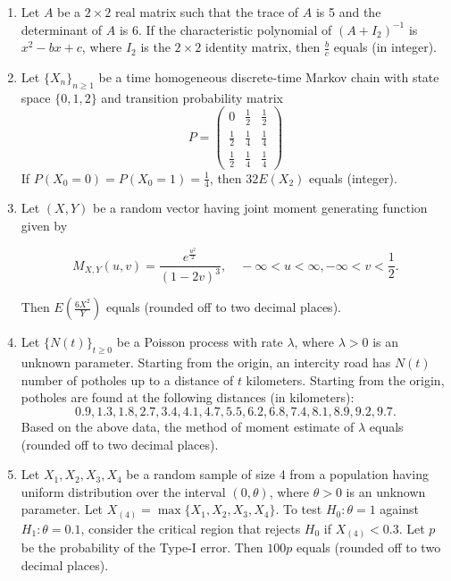 \documentclass[journal,12pt,onecolumn]{IEEEtran}
\theoremstyle{remark}
\begin{document}
\begin{enumerate}
    \item Let $A$ be a $2 \times 2$ real matrix such that the trace of $A$ is 5 and the determinant of $A$ is 6. If the characteristic polynomial of $(A + I_2)^{-1}$ is $x^2 - bx + c$, where $I_2$ is the $2 \times 2$ identity matrix, then $\frac{b}{c}$ equals {\underline{\hspace{2cm}}} (in integer).

    \item Let $\{X_n\}_{n \geq 1}$ be a time homogeneous discrete-time Markov chain with state space $\{0, 1, 2\}$ and transition probability matrix
\[
    P = \begin{pmatrix}
        0 & \frac{1}{2} & \frac{1}{2} \\
        \frac{1}{2} & \frac{1}{4} & \frac{1}{4} \\
        \frac{1}{2} & \frac{1}{4} & \frac{1}{4}
    \end{pmatrix}
\]
    If $P(X_0 = 0) = P(X_0 = 1) = \frac{1}{4}$, then $32 E(X_2)$ equals  {\underline{\hspace{2cm}}}  (integer).


    \item Let $(X, Y)$ be a random vector having joint moment generating function given by

    $$M_{X,Y}(u, v) = \frac{e^{\frac{u^2}{2}}}{(1 - 2v)^3}, \quad -\infty < u < \infty, -\infty < v < \frac{1}{2}.$$

    Then $E(\frac{6X^2}{Y})$ equals {\underline{\hspace{2cm}}} (rounded off to two decimal places).

    \item Let $\{N(t)\}_{t \geq 0}$ be a Poisson process with rate $\lambda$, where $\lambda > 0$ is an unknown parameter. Starting from the origin, an intercity road has $N(t)$ number of potholes up to a distance of $t$ kilometers. Starting from the origin, potholes are found at the following distances (in kilometers):
\[
    0.9, 1.3, 1.8, 2.7, 3.4, 4.1, 4.7, 5.5, 6.2, 6.8, 7.4, 8.1, 8.9, 9.2, 9.7.
\]
    Based on the above data, the method of moment estimate of $\lambda$ equals  {\underline{\hspace{2cm}}} (rounded off to two decimal places).

    \item Let $X_1, X_2, X_3, X_4$ be a random sample of size 4 from a population having uniform distribution over the interval $(0, \theta)$, where $\theta > 0$ is an unknown parameter. Let $X_{(4)} = \max\{X_1, X_2, X_3, X_4\}$. To test $H_0: \theta = 1$ against $H_1: \theta = 0.1$, consider the critical region that rejects $H_0$ if $X_{(4)} < 0.3$. Let $p$ be the probability of the Type-I error. Then $100p$ equals  {\underline{\hspace{2cm}}} (rounded off to two decimal places).


\end{enumerate}
\end{document}
